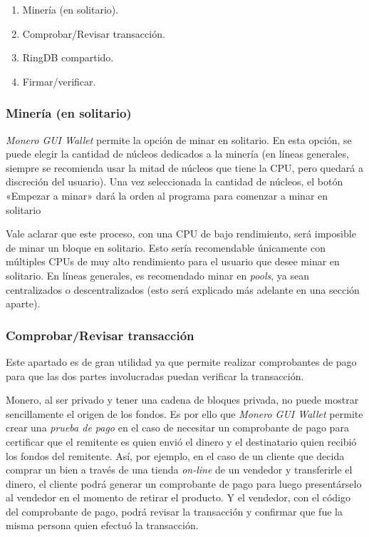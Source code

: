 \documentclass[12pt,a4paper,twoside]{book}
\begin{document}
\begin{enumerate}
\item Minería (en solitario).
\item Comprobar/Revisar transacción.
\item RingDB compartido.
\item Firmar/verificar.
\end{enumerate}

\subsubsection{Minería (en solitario)}
\textit{Monero GUI Wallet} permite la opción de minar en solitario. En esta opción, se puede elegir la cantidad de núcleos dedicados a la minería (en líneas generales, siempre se recomienda usar la mitad de núcleos que tiene la CPU, pero quedará a discreción del usuario). Una vez seleccionada la cantidad de núcleos, el botón «Empezar a minar» dará la orden al programa para comenzar a minar en solitario

Vale aclarar que este proceso, con una CPU de bajo rendimiento, será imposible de minar un bloque en solitario. Esto sería recomendable únicamente con múltiples CPUs de muy alto rendimiento para el usuario que desee minar en solitario. En líneas generales, es recomendado minar en \textit{pools}, ya sean centralizados o descentralizados (esto será explicado más adelante en una sección aparte).

\subsubsection{Comprobar/Revisar transacción}
Este apartado es de gran utilidad ya que permite realizar comprobantes de pago para que las dos partes involucradas puedan verificar la transacción.

Monero, al ser privado y tener una cadena de bloques privada, no puede mostrar sencillamente el origen de los fondos. Es por ello que \textit{Monero GUI Wallet} permite crear una \textit{prueba de pago} en el caso de necesitar un comprobante de pago para certificar que el remitente es quien envió el dinero y el destinatario quien recibió los fondos del remitente. Así, por ejemplo, en el caso de un cliente que decida comprar un bien a través de una tienda \textit{on-line} de un vendedor y transferirle el dinero, el cliente podrá generar un comprobante de pago para luego presentárselo al vendedor en el momento de retirar el producto. Y el vendedor, con el código del comprobante de pago, podrá revisar la transacción y confirmar que fue la misma persona quien efectuó la transacción.
\end{document}
